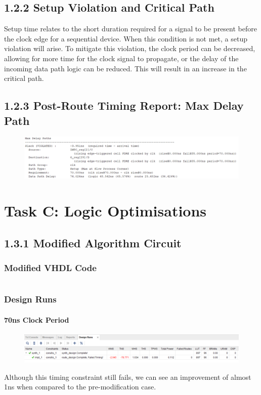 \documentclass[11pt]{report}
\begin{document}
\section*{1.2.2 Setup Violation and Critical Path}
Setup time relates to the short duration required for a signal to be present before the clock edge for a sequential device. When this condition is not met, a setup violation will arise. To mitigate this violation, the clock period can be decreased, allowing for more time for the clock signal to propagate, or the delay of the incoming data path logic can be reduced. This will result in an increase in the critical path.

\section*{1.2.3 Post-Route Timing Report: Max Delay Path}
\begin{figure}[H]
    \includegraphics[width=\columnwidth]{Waveforms/1.2.3_max-path-delay.png}
\end{figure}


\chapter*{Task C: Logic Optimisations}

\section*{1.3.1 Modified Algorithm Circuit}
\subsection*{Modified VHDL Code}
\inputminted[firstline=23]{vhdl}{"../../Lab2/Lab2.srcs/sources_1/imports/Digital Engineering/Algorithm.vhd"}

\subsection*{Design Runs}
\subsubsection*{70ns Clock Period}
\begin{figure}[H]
    \includegraphics[width=\columnwidth]{Waveforms/taskc_70ns_design-runs.png}
\end{figure}
Although this timing constraint still fails, we can see an improvement of almost 1ns when compared to the pre-modification case.
\end{document}
